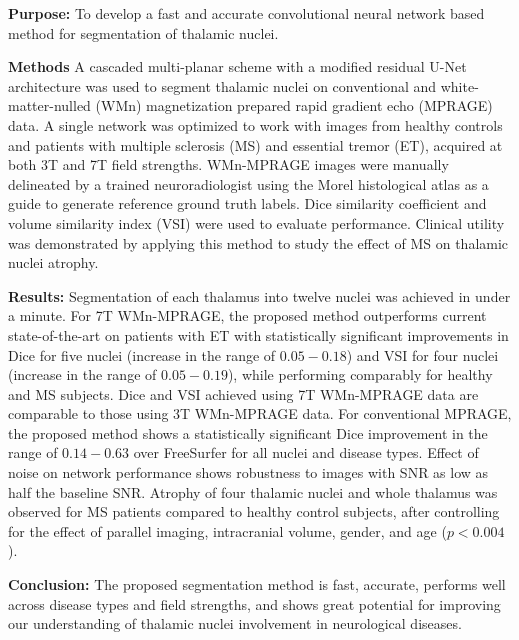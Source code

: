 \textbf{Purpose:}
To develop a fast and accurate convolutional neural network based method for segmentation of thalamic nuclei.

\textbf{Methods}
A cascaded multi-planar scheme with a modified residual U-Net architecture was used to segment thalamic nuclei on conventional and white-matter-nulled (WMn) magnetization prepared rapid gradient echo (MPRAGE) data. A single network was optimized to work with images from healthy controls and patients with multiple sclerosis (MS) and essential tremor (ET), acquired at both 3T and 7T field strengths. WMn-MPRAGE images were manually delineated by a trained neuroradiologist using the Morel histological atlas as a guide to generate reference ground truth labels. Dice similarity coefficient and volume similarity index (VSI) were used to evaluate performance. Clinical utility was demonstrated by applying this method to study the effect of MS on thalamic nuclei atrophy.

\textbf{Results:}
Segmentation of each thalamus into twelve nuclei was achieved in under a minute. For 7T WMn-MPRAGE, the proposed method outperforms current state-of-the-art on patients with ET with statistically significant improvements in Dice for five nuclei (increase in the range of $0.05-0.18$) and VSI for four nuclei (increase in the range of $0.05-0.19$), while performing comparably for healthy and MS subjects. Dice and VSI achieved using 7T WMn-MPRAGE data are comparable to those using 3T WMn-MPRAGE data. For conventional MPRAGE, the proposed method shows a statistically significant Dice improvement in the range of $0.14-0.63$ over FreeSurfer for all nuclei and disease types. Effect of noise on network performance shows robustness to images with SNR as low as half the baseline SNR\@. Atrophy of four thalamic nuclei and whole thalamus was observed for MS patients compared to healthy control subjects, after controlling for the effect of parallel imaging, intracranial volume, gender, and age ($p < 0.004$).

\textbf{Conclusion:}
The proposed segmentation method is fast, accurate, performs well across disease types and field strengths, and shows great potential for improving our understanding of thalamic nuclei involvement in neurological diseases.
